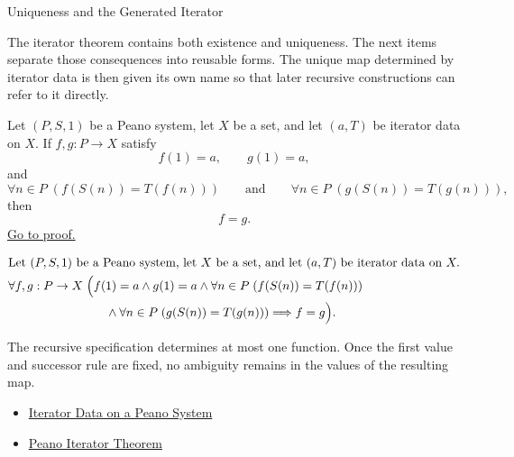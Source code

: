 \begin{topicbox}{Uniqueness and the Generated Iterator}
\begin{exposition}
The iterator theorem contains both existence and uniqueness. The next items
separate those consequences into reusable forms. The unique map determined by
iterator data is then given its own name so that later recursive
constructions can refer to it directly.
\end{exposition}

\begin{tcolorbox}[colback=propbox, colframe=propborder, arc=2pt,
  left=6pt, right=6pt, top=4pt, bottom=4pt,
  title={\small\textbf{Corollary (Uniqueness of Recursively Defined Functions)}},
  fonttitle=\small\bfseries]
\begin{corollary}
\label{cor:uniqueness-of-recursively-defined-functions}
Let $(P,S,1)$ be a Peano system, let $X$ be a set, and let $(a,T)$ be iterator
data on $X$. If $f,g : P \to X$ satisfy
\[
f(1)=a,\qquad g(1)=a,
\]
and
\[
\forall n \in P\;(f(S(n))=T(f(n)))
\qquad\text{and}\qquad
\forall n \in P\;(g(S(n))=T(g(n))),
\]
then
\[
f=g.
\]
\hyperref[prf-uniqueness-of-recursively-defined-functions]{Go to proof.}
\end{corollary}
\end{tcolorbox}

\begin{remark*}
\[
\begin{aligned}
&\text{Let } (P,S,1) \text{ be a Peano system, let } X \text{ be a set, and let } (a,T) \text{ be iterator data on } X.\\
&\forall f,g : P \to X\;\Bigl(
f(1)=a \land g(1)=a \land
\forall n \in P\;(f(S(n))=T(f(n))) \\
&\qquad\qquad\qquad\qquad\land
\forall n \in P\;(g(S(n))=T(g(n)))
\Longrightarrow f=g\Bigr).
\end{aligned}
\]
\end{remark*}

\begin{remark*}[Interpretation]
The recursive specification determines at most one function. Once the first
value and successor rule are fixed, no ambiguity remains in the values of the
resulting map.
\end{remark*}

\begin{remark*}[Dependencies]
\begin{itemize}
  \item \hyperref[def:iterator-data-on-peano-system]{Iterator Data on a Peano System}
  \item \hyperref[thm:peano-iterator-theorem]{Peano Iterator Theorem}
\end{itemize}
\end{remark*}


\end{topicbox}

